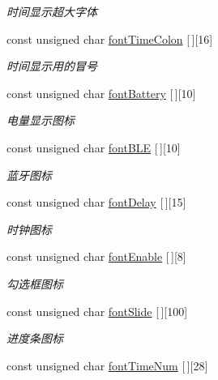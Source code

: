 \begin{DoxyCompactItemize}
\begin{DoxyCompactList}\small\item\em 时间显示超大字体 \end{DoxyCompactList}\item 
const unsigned char \hyperlink{group___w_i_d_g_e_t_ga934cfdf8aedca0ff9a8794005da8d5e0}{font\-Time\-Colon} \mbox{[}$\,$\mbox{]}\mbox{[}16\mbox{]}
\begin{DoxyCompactList}\small\item\em 时间显示用的冒号 \end{DoxyCompactList}\item 
const unsigned char \hyperlink{group___w_i_d_g_e_t_ga9cac21b10aac988fd92e2cd2c78a4319}{font\-Battery} \mbox{[}$\,$\mbox{]}\mbox{[}10\mbox{]}
\begin{DoxyCompactList}\small\item\em 电量显示图标 \end{DoxyCompactList}\item 
const unsigned char \hyperlink{group___w_i_d_g_e_t_gae789ac73b9f8bf563ff477571af3e532}{font\-B\-L\-E} \mbox{[}$\,$\mbox{]}\mbox{[}10\mbox{]}
\begin{DoxyCompactList}\small\item\em 蓝牙图标 \end{DoxyCompactList}\item 
const unsigned char \hyperlink{group___w_i_d_g_e_t_ga4281d2c990312a449f8115a73da5d4b6}{font\-Delay} \mbox{[}$\,$\mbox{]}\mbox{[}15\mbox{]}
\begin{DoxyCompactList}\small\item\em 时钟图标 \end{DoxyCompactList}\item 
const unsigned char \hyperlink{group___w_i_d_g_e_t_ga7ef23e7312ba1eef34a75bae365cf3e3}{font\-Enable} \mbox{[}$\,$\mbox{]}\mbox{[}8\mbox{]}
\begin{DoxyCompactList}\small\item\em 勾选框图标 \end{DoxyCompactList}\item 
const unsigned char \hyperlink{group___w_i_d_g_e_t_ga934307f74cc38f1062d272ab796d7715}{font\-Slide} \mbox{[}$\,$\mbox{]}\mbox{[}100\mbox{]}
\begin{DoxyCompactList}\small\item\em 进度条图标 \end{DoxyCompactList}\item 
\hypertarget{group___w_i_d_g_e_t_ga4e313eb11c9272ec38246bbc0f4cec42}{const unsigned char \hyperlink{group___w_i_d_g_e_t_ga4e313eb11c9272ec38246bbc0f4cec42}{font\-Time\-Num} \mbox{[}$\,$\mbox{]}\mbox{[}28\mbox{]}}\label{group___w_i_d_g_e_t_ga4e313eb11c9272ec38246bbc0f4cec42}


\end{DoxyCompactItemize}
